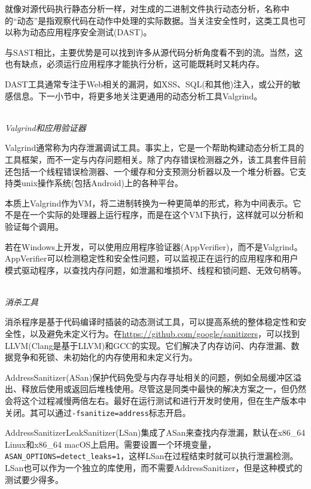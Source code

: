 就像对源代码执行静态分析一样，对生成的二进制文件执行动态分析，名称中的“动态”是指观察代码在动作中处理的实际数据。当关注安全性时，这类工具也可以称为动态应用程序安全测试(DAST)。

与SAST相比，主要优势是可以找到许多从源代码分析角度看不到的流。当然，这也有缺点，必须运行应用程序才能执行分析，这可能既耗时又耗内存。

DAST工具通常专注于Web相关的漏洞，如XSS、SQL(和其他)注入，或公开的敏感信息。下一小节中，将更多地关注更通用的动态分析工具Valgrind。

\hspace*{\fill} \\ %
\noindent
\textit{Valgrind和应用验证器}

Valgrind通常称为内存泄漏调试工具。事实上，它是一个帮助构建动态分析工具的工具框架，而不一定与内存问题相关。除了内存错误检测器之外，该工具套件目前还包括一个线程错误检测器、一个缓存和分支预测分析器以及一个堆分析器。它支持类unix操作系统(包括Android)上的各种平台。

本质上Valgrind作为VM，将二进制转换为一种更简单的形式，称为中间表示。它不是在一个实际的处理器上运行程序，而是在这个VM下执行，这样就可以分析和验证每个调用。

若在Windows上开发，可以使用应用程序验证器(AppVerifier)，而不是Valgrind。AppVerifier可以检测稳定性和安全性问题，可以监视正在运行的应用程序和用户模式驱动程序，以查找内存问题，如泄漏和堆损坏、线程和锁问题、无效句柄等。

\hspace*{\fill} \\ %
\noindent
\textit{消杀工具}

消杀程序是基于代码编译时插装的动态测试工具，可以提高系统的整体稳定性和安全性，以及避免未定义行为。在\url{https://github.com/google/sanitizers}，可以找到LLVM(Clang是基于LLVM)和GCC的实现。它们解决了内存访问、内存泄漏、数据竞争和死锁、未初始化的内存使用和未定义行为。

AddressSanitizer(ASan)保护代码免受与内存寻址相关的问题，例如全局缓冲区溢出、释放后使用或返回后堆栈使用。尽管这是同类中最快的解决方案之一，但仍然会将这个过程减慢两倍左右。最好在运行测试和进行开发时使用，但在生产版本中关闭。其可以通过\texttt{-fsanitize=address}标志开启。

AddressSanitizerLeakSanitizer(LSan)集成了ASan来查找内存泄漏，默认在x86\_64 Linux和x86\_64 macOS上启用。需要设置一个环境变量，\texttt{ASAN\_OPTIONS=detect\_leaks=1}，这样LSan在过程结束时就可以执行泄漏检测。LSan也可以作为一个独立的库使用，而不需要AddressSanitizer，但是这种模式的测试要少得多。

